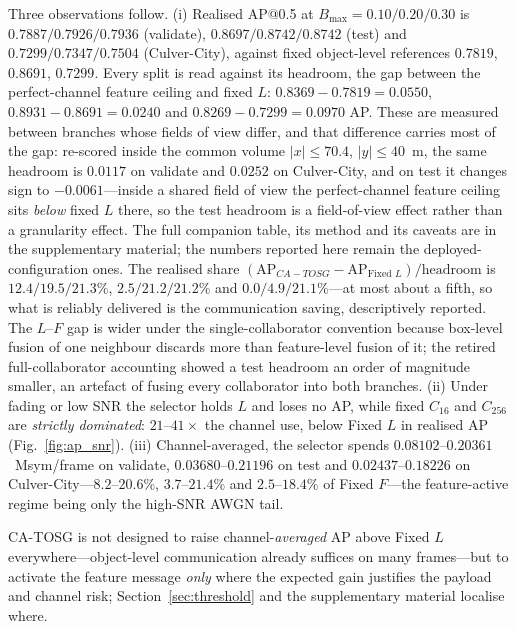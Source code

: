 \documentclass[journal]{IEEEtran}
\newcommand{\method}{CA-TOSG}
\begin{document}
Three observations follow. (i) Realised AP@0.5 at $B_{\max}=0.10/0.20/0.30$ is $0.7887/0.7926/0.7936$ (validate), $0.8697/0.8742/0.8742$ (test) and $0.7299/0.7347/0.7504$ (Culver-City), against fixed object-level references $0.7819$, $0.8691$, $0.7299$. Every split is read against its headroom, the gap between the perfect-channel feature ceiling and fixed $L$: $0.8369-0.7819=0.0550$, $0.8931-0.8691=0.0240$ and $0.8269-0.7299=0.0970$ AP. These are measured between branches whose fields of view differ, and that difference carries most of the gap: re-scored inside the common volume $|x|\le70.4$, $|y|\le40$~m, the same headroom is $0.0117$ on validate and $0.0252$ on Culver-City, and on test it changes sign to $-0.0061$---inside a shared field of view the perfect-channel feature ceiling sits \emph{below} fixed $L$ there, so the test headroom is a field-of-view effect rather than a granularity effect. The full companion table, its method and its caveats are in the supplementary material; the numbers reported here remain the deployed-configuration ones. The realised share $(\mathrm{AP}_{\method{}}-\mathrm{AP}_{\text{Fixed }L})/\text{headroom}$ is $12.4/19.5/21.3\%$, $2.5/21.2/21.2\%$ and $0.0/4.9/21.1\%$---at most about a fifth, so what is reliably delivered is the communication saving, descriptively reported. The $L$--$F$ gap is wider under the single-collaborator convention because box-level fusion of one neighbour discards more than feature-level fusion of it; the retired full-collaborator accounting showed a test headroom an order of magnitude smaller, an artefact of fusing every collaborator into both branches. (ii) Under fading or low SNR the selector holds $L$ and loses no AP, while fixed $C_{16}$ and $C_{256}$ are \emph{strictly dominated}: $21\text{--}41\times$ the channel use, below Fixed $L$ in realised AP (Fig.~\ref{fig:ap_snr}). (iii) Channel-averaged, the selector spends $0.08102$--$0.20361$~Msym/frame on validate, $0.03680$--$0.21196$ on test and $0.02437$--$0.18226$ on Culver-City---$8.2$--$20.6\%$, $3.7$--$21.4\%$ and $2.5$--$18.4\%$ of Fixed $F$---the feature-active regime being only the high-SNR AWGN tail.

\method{} is not designed to raise channel-\emph{averaged} AP above Fixed $L$ everywhere---object-level communication already suffices on many frames---but to activate the feature message \emph{only} where the expected gain justifies the payload and channel risk; Section~\ref{sec:threshold} and the supplementary material localise where.
\end{document}
